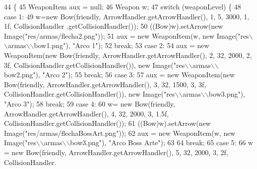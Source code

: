 \begin{DoxyCode}
44                                                                                                            
                 \{
45         WeaponItem aux = null;
46         Weapon w;
47         \textcolor{keywordflow}{switch} (weaponLevel) \{
48             \textcolor{keywordflow}{case} 1:
49                     w=\textcolor{keyword}{new} Bow(friendly, ArrowHandler.getArrowHandler(), 1, 5, 3000, 1, 1f, CollisionHandler
      .getCollisionHandler());
50                     ((Bow)w).setArrow(\textcolor{keyword}{new} Image(\textcolor{stringliteral}{"res/armas/flecha2.png"}));
51                 aux = \textcolor{keyword}{new} WeaponItem(w, \textcolor{keyword}{new} Image(\textcolor{stringliteral}{"res\(\backslash\)\(\backslash\)armas\(\backslash\)\(\backslash\)bow1.png"}), \textcolor{stringliteral}{"Arco 1"});
52                 \textcolor{keywordflow}{break};
53             \textcolor{keywordflow}{case} 2:
54                 aux = \textcolor{keyword}{new} WeaponItem(\textcolor{keyword}{new} Bow(friendly, ArrowHandler.getArrowHandler(), 2, 32, 2000, 2, 3f, 
      CollisionHandler.getCollisionHandler()), \textcolor{keyword}{new} Image(\textcolor{stringliteral}{"res\(\backslash\)\(\backslash\)armas\(\backslash\)\(\backslash\)bow2.png"}), \textcolor{stringliteral}{"Arco 2"});
55                 \textcolor{keywordflow}{break};
56             \textcolor{keywordflow}{case} 3:
57                 aux = \textcolor{keyword}{new} WeaponItem(\textcolor{keyword}{new} Bow(friendly, ArrowHandler.getArrowHandler(), 3, 32, 1500, 3, 3f, 
      CollisionHandler.getCollisionHandler()), \textcolor{keyword}{new} Image(\textcolor{stringliteral}{"res\(\backslash\)\(\backslash\)armas\(\backslash\)\(\backslash\)bow3.png"}), \textcolor{stringliteral}{"Arco 3"});
58                 \textcolor{keywordflow}{break};
59             \textcolor{keywordflow}{case} 4:
60                  w= \textcolor{keyword}{new} Bow(friendly, ArrowHandler.getArrowHandler(), 4, 32, 2000, 3, 1.5f, 
      CollisionHandler.getCollisionHandler());
61                 ((Bow)w).setArrow(\textcolor{keyword}{new} Image(\textcolor{stringliteral}{"res/armas/flechaBossArt.png"}));
62                 aux = \textcolor{keyword}{new} WeaponItem(w, \textcolor{keyword}{new} Image(\textcolor{stringliteral}{"res\(\backslash\)\(\backslash\)armas\(\backslash\)\(\backslash\)bow3.png"}), \textcolor{stringliteral}{"Arco Boss Arte"});
63 
64                 \textcolor{keywordflow}{break};
65             \textcolor{keywordflow}{case} 5:
66                 w = \textcolor{keyword}{new} Bow(friendly, ArrowHandler.getArrowHandler(), 5, 32, 2000, 3, 2f, CollisionHandler.

\end{DoxyCode}
